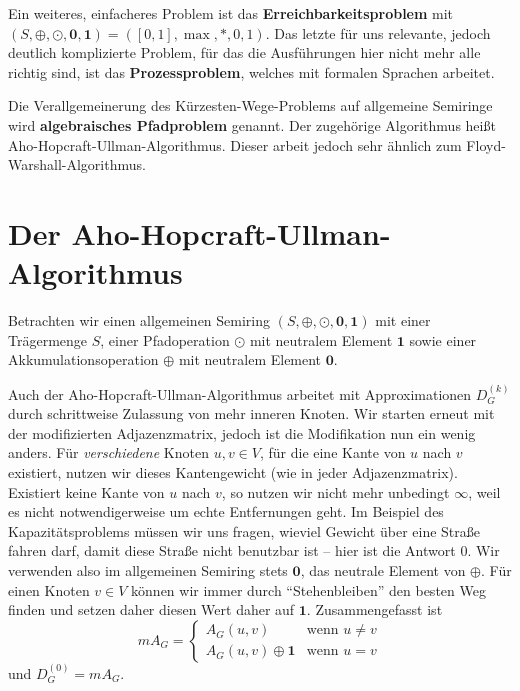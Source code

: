 \documentclass[ngerman, a4paper, 12pt]{article}
\theoremstyle{mystyle}
\begin{document}
	Ein weiteres, einfacheres Problem ist das \textbf{Erreichbarkeitsproblem} mit $(S, \oplus, \odot, \mathbf{0}, \mathbf{1}) = ([0,1], \max, *, 0, 1)$. Das letzte für uns relevante, jedoch deutlich komplizierte Problem, für das die Ausführungen hier nicht mehr alle richtig sind, ist das \textbf{Prozessproblem}, welches mit formalen Sprachen arbeitet.
	
	Die Verallgemeinerung des Kürzesten-Wege-Problems auf allgemeine Semiringe wird \textbf{algebraisches Pfadproblem} genannt. Der zugehörige Algorithmus heißt Aho-Hopcraft-Ullman-Algorithmus. Dieser arbeit jedoch sehr ähnlich zum Floyd-Warshall-Algorithmus.
	
	
	\section{Der Aho-Hopcraft-Ullman-Algorithmus}
	
	Betrachten wir einen allgemeinen Semiring $(S, \oplus, \odot, \mathbf{0}, \mathbf{1})$ mit einer Trägermenge $S$, einer Pfadoperation $\odot$ mit neutralem Element $\mathbf{1}$ sowie einer Akkumulationsoperation $\oplus$ mit neutralem Element $\mathbf{0}$. 
	
	Auch der Aho-Hopcraft-Ullman-Algorithmus arbeitet mit Approximationen $D_G^{(k)}$ durch schrittweise Zulassung von mehr inneren Knoten. Wir starten erneut mit der modifizierten Adjazenzmatrix, jedoch ist die Modifikation nun ein wenig anders.
	Für \textit{verschiedene} Knoten $u, v \in V$, für die eine Kante von $u$ nach $v$ existiert, nutzen wir dieses Kantengewicht (wie in jeder Adjazenzmatrix). Existiert keine Kante von $u$ nach $v$, so nutzen wir nicht mehr unbedingt $\infty$, weil es nicht notwendigerweise um echte Entfernungen geht. Im Beispiel des Kapazitätsproblems müssen wir uns fragen, wieviel Gewicht über eine Straße fahren darf, damit diese Straße nicht benutzbar ist -- hier ist die Antwort $0$. Wir verwenden also im allgemeinen Semiring stets $\mathbf{0}$, das neutrale Element von $\oplus$.
	Für einen Knoten $v \in V$ können wir immer durch \enquote{Stehenbleiben} den besten Weg finden und setzen daher diesen Wert daher auf $\mathbf{1}$. Zusammengefasst ist
	\begin{equation*}
		mA_G = \begin{cases}
			A_G(u,v) & \text{wenn } u \neq v \\
			A_G(u,v) \oplus \mathbf{1} & \text{wenn } u = v
		\end{cases}
	\end{equation*}
	und $D_G^{(0)} = mA_G$.
	
\end{document}
